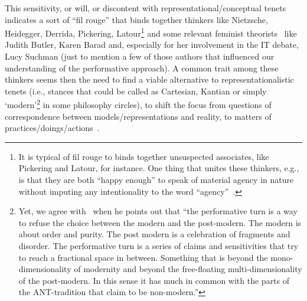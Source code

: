 \documentclass{article}
\begin{document}
This sensitivity, or will, or discontent with representational/conceptual tenets indicates a sort of ``fil rouge'' that binds together thinkers like Nietzsche, Heidegger, Derrida, Pickering, Latour\footnote{It is typical of fil rouge to binds together unsuspected associates, like Pickering and Latour, for instance. One thing that unites these thinkers, e.g., is that they are both ``happy enough'' to speak of material agency in nature without imputing any intentionality to the word ``agency''~\citep[p. 6]{pickering_mangle_1995}.} and some relevant feminist theorists~\citep{bath_searching_2009} like Judith Butler, Karen Barad and, especially for her involvement in the IT debate, Lucy Suchman (just to mention a few of those authors that influenced our understanding of the performative approach). A common trait among these thinkers seems then the need to find a viable alternative to representationalistic tenets (i.e., stances that could be called as Cartesian, Kantian or simply `modern'\footnote{Yet, we agree with~\citet{jensen_performing_2002} when he points out that ``the performative turn is a way to refuse the choice between the modern and the post-modern. The modern is about order and purity. The post modern is a celebration of fragments and disorder. The performative turn is a series of claims and sensitivities that try to reach a fractional space in between. Something that is beyond the mono-dimensionality of modernity and beyond the free-floating multi-dimensionality of the post-modern. In this sense it has much in common with the parts of the ANT-tradition that claim to be non-modern.''} in some philosophy circles\citep[cf., e.g., ][]{rorty_objectivity_1991}), to shift the focus from questions of correspondence between models/representations and reality, to matters of practices/doings/actions~\citep{barad_posthumanist_2003}.  
\end{document}
